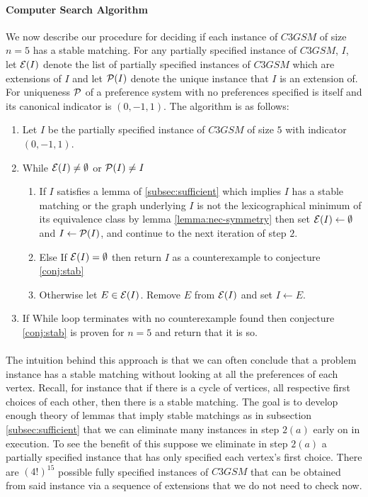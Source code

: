 \paragraph{Computer Search Algorithm}
We now describe our procedure for deciding if each instance of $C3GSM$ of size $n=5$ has a stable matching. For any partially specified instance of $C3GSM$, $I$, let $\mathcal{E}(I)$ denote the list of partially specified instances of $C3GSM$ which are extensions of $I$ and let $\mathcal{P}(I)$ denote the unique instance that $I$ is an extension of. For uniqueness $\mathcal{P}$ of a preference system with no preferences specified is itself and its canonical indicator is $(0,-1,1)$. The algorithm is as follows:
\begin{enumerate}
\item Let $I$ be the partially specified instance of $C3GSM$ of size $5$ with indicator $(0,-1,1)$.
\item While $\mathcal{E}(I) \neq \emptyset$ or $\mathcal{P}(I) \neq I$
	\begin{enumerate}
	\item If $I$ satisfies a lemma of \ref{subsec:sufficient} which implies $I$ has a stable matching or the graph underlying $I$ is not the lexicographical minimum of its equivalence class by lemma \ref{lemma:nec-symmetry} then set $\mathcal{E}(I) \leftarrow \emptyset$ and $I \leftarrow \mathcal{P}(I)$, and continue to the next iteration of step $2$.
	\item Else If $\mathcal{E}(I) = \emptyset$ then return $I$ as a counterexample to conjecture \ref{conj:stab}
	\item Otherwise let $E \in \mathcal{E}(I)$. Remove $E$ from $\mathcal{E}(I)$ and set $I \leftarrow E$. 
	\end{enumerate}
\item If While loop terminates with no counterexample found then conjecture \ref{conj:stab} is proven for $n=5$ and return that it is so.
\end{enumerate}
\paragraph{}
The intuition behind this approach is that we can often conclude that a problem instance has a stable matching without looking at all the preferences of each vertex. Recall, for instance that if there is a cycle of vertices, all respective first choices of each other, then there is a stable matching. The goal is to develop enough theory of lemmas that imply stable matchings as in subsection \ref{subsec:sufficient} that we can eliminate many instances in step $2(a)$ early on in execution. To see the benefit of this suppose we eliminate in step $2(a)$ a partially specified instance that has only specified each vertex's first choice. There are $(4!)^{15}$ possible fully specified instances of $C3GSM$ that can be obtained from said instance via a sequence of extensions that we do not need to check now.

